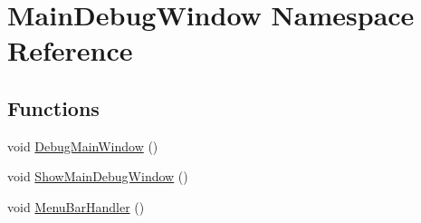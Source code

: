 \hypertarget{namespace_main_debug_window}{}\section{Main\+Debug\+Window Namespace Reference}
\label{namespace_main_debug_window}
\subsection*{Functions}
\begin{DoxyCompactItemize}
\item 
void \mbox{\hyperlink{namespace_main_debug_window_ae86fa1cdeae81822f5567320f9d56f65}{Debug\+Main\+Window}} ()
\item 
void \mbox{\hyperlink{namespace_main_debug_window_ae0112f4e295169b45c2615b4915e3cc5}{Show\+Main\+Debug\+Window}} ()
\item 
void \mbox{\hyperlink{namespace_main_debug_window_a2c9084a9752a2e4ef87b8ca3039f5a4d}{Menu\+Bar\+Handler}} ()
\end{DoxyCompactItemize}
